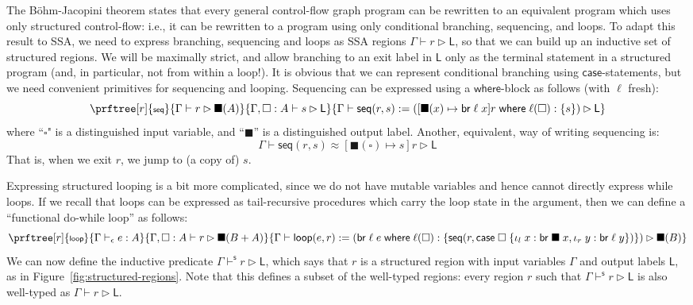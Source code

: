 \documentclass[acmsmall,screen,review]{acmart}
\newcommand{\ms}[1]{\ensuremath{\mathsf{#1}}}
\newcommand{\lto}{:}
\newcommand{\linl}[1]{\iota_l\;{#1}}
\newcommand{\linr}[1]{\iota_r\;{#1}}
\newcommand{\brb}[2]{\ms{br}\;#1\;#2}
\newcommand{\casestmt}[5]{\ms{case}\;#1\;\{\linl{#2} \lto #3, \linr{#4} \lto #5\}}
\newcommand{\where}[2]{#1\;\ms{where}\;#2}
\newcommand{\wbranch}[3]{#1(#2) \lto \{#3\}}
\newcommand{\bhyp}[2]{#1 : #2}
\newcommand{\rle}[1]{{\scriptsize\textsf{#1}}}
\newcommand{\hasty}[4]{#1 \vdash_{#2} #3: {#4}}
\newcommand{\haslb}[3]{#1 \vdash #2 \rhd #3}
\newcommand{\shaslb}[3]{#1 \vdash^{\ms{s}} #2 \rhd #3}
\newcommand{\teqv}{\approx}
\newcommand{\lbeq}[4]{#1 \vdash #2 \teqv #3 \rhd {#4}}
\newcommand{\invar}{\square}
\newcommand{\outlb}{\blacksquare}
\begin{document}
The B\"ohm-Jacopini theorem states that every general control-flow graph program can be rewritten to
an equivalent program which uses only structured control-flow: i.e., it can be rewritten to a program
using only conditional branching, sequencing, and loops. To adapt this result to SSA, we
need to express branching, sequencing and loops as SSA regions $\haslb{\Gamma}{r}{\ms{L}}$, 
so that we can build up an inductive set of structured regions. We will be maximally strict, and
allow branching to an exit label in $\ms{L}$ only as the terminal statement in a structured program
(and, in particular, not from within a loop!). It is obvious that we can represent conditional
branching using \ms{case}-statements, but we need convenient primitives for sequencing and looping.
Sequencing can be expressed using a \ms{where}-block as follows (with $\ell$ fresh):
\begin{equation}
  \prftree[r]{\rle{seq}}
    {\haslb{\Gamma}{r}{\outlb(A)}}
    {\haslb{\Gamma, \bhyp{\invar}{A}}{s}{\ms{L}}}
    {\haslb{\Gamma}{\ms{seq}(r, s) 
      := (\where{[\outlb(x) \mapsto \brb{\ell}{x}]r}{\wbranch{\ell}{\invar}{s}})}{\ms{L}}}
\end{equation}
where ``$\invar$" is a distinguished input variable, and ``$\outlb$'' is a distinguished output
label. Another, equivalent, way of writing sequencing is: 
\begin{equation}
  \lbeq{\Gamma}{\ms{seq}(r, s)}{[\outlb(\invar) \mapsto s]r}{\ms{L}}
\end{equation}
That is, when we exit $r$, we jump to (a copy of) $s$. 

Expressing structured looping is a bit more complicated, since we do not have
mutable variables and hence cannot directly express while loops. If we recall that loops
can be expressed as tail-recursive procedures which carry the loop state in the argument,
then we can define a ``functional do-while loop'' as follows: 
\begin{equation}
  \prftree[r]{\rle{loop}}
    {\hasty{\Gamma}{\epsilon}{e}{A}}
    {\haslb{\Gamma, \bhyp{\invar}{A}}{r}{\outlb(B + A)}}
    {\haslb{\Gamma}{\ms{loop}(e, r) 
      := (\where{\brb{\ell}{e}}{\wbranch{\ell}{\invar}
        {\ms{seq}(r, \casestmt{\invar}{x}{\brb{\outlb}{x}}{y}{\brb{\ell}{y}})}})}{\outlb(B)}}
\end{equation}
%
We can now define the inductive predicate
$\shaslb{\Gamma}{r}{\ms{L}}$, which says that $r$ is a structured
region with input variables $\Gamma$ and output labels $\ms{L}$, as in
Figure~\ref{fig:structured-regions}. Note that this defines a subset of the
well-typed regions: every region $r$ such that
$\shaslb{\Gamma}{r}{\ms{L}}$ is also well-typed as $\haslb{\Gamma}{r}{\ms{L}}$.
\end{document}
